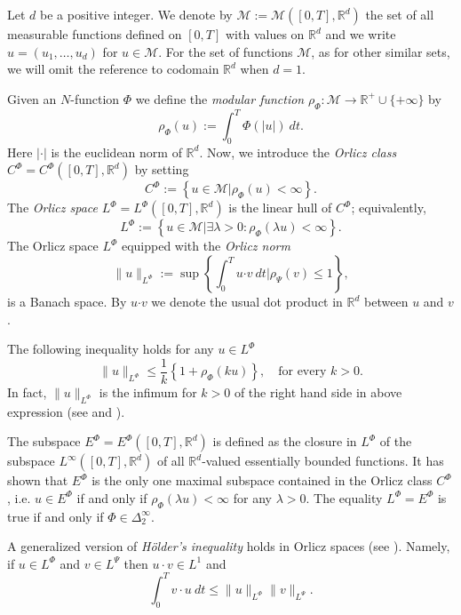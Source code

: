 \documentclass[twoside]{elsarticle}
\theoremstyle{remark}
\newcommand{\orlnor}{\|_{L^{\Phi}}}
\newcommand{\lphi}{L^{\Phi}}
\newcommand{\lpsi}{L^{\Psi}}
\newcommand{\ephi}{E^{\Phi}}
\newcommand{\claseor}{C^{\Phi}}
\renewcommand{\b}[1]{\boldsymbol{#1}}
\newcommand{\rr}{\mathbb{R}}
\renewcommand{\leq}{\leqslant}
\begin{document}
Let $d$ be a positive integer. We denote by $\mathcal{M}:=\mathcal{M}([0,T],\rr^d)$  the set of all measurable functions defined on $[0,T]$ with values on $\mathbb{R}^d$ and  we write $u=(u_1,\dots,u_d)$ for  $u\in \mathcal{M}$. For the set of functions $\mathcal{M}$, as for other similar sets, we will omit the reference to codomain $\mathbb{R}^d$ when $d=1$.


Given  an $N$-function $\Phi$ we define the \emph{modular function} 
$\rho_{\Phi}:\mathcal{M}\to \mathbb{R}^+\cup\{+\infty\}$ by
\[\rho_{\Phi}(u):= \int_0^T \Phi(|u|)\ dt.\]
Here $|\cdot|$ is the euclidean norm of $\mathbb{R}^d$.
Now, we introduce the \emph{Orlicz class} $C^{\Phi}=C^{\Phi}([0,T],\rr^d)$   by setting
\begin{equation}\label{claseOrlicz}
  C^{\Phi}:=\left\{u\in \mathcal{M} | \rho_{\Phi}(u)< \infty \right\}.
\end{equation}
The \emph{Orlicz space} $\lphi=L^{\Phi}([0,T],\rr^d)$ is the linear hull of $\claseor$;
equivalently,
\begin{equation}\label{espacioOrlicz}
\lphi:=\left\{ u\in \mathcal{M}| \exists \lambda>0: \rho_{\Phi}(\lambda u) < \infty   \right\}.
\end{equation}
  The Orlicz space $\lphi$ equipped with the \emph{Orlicz norm}
\[
\|  u  \orlnor:=\sup \left\{  \int_0^T u\b{\cdot} v\ dt \big| \rho_{\Psi}(v)\leq 1\right\},
\]
is a Banach space. By $u\b{\cdot} v$ we denote the usual dot product in $\mathbb{R}^{d}$ between $u$ and $v$.

The following  inequality holds for any $u\in\lphi$
\begin{equation}\label{amemiya-ine}
\|u\orlnor\leq \frac{1}{k}\left\{1+\rho_{\Phi}(ku)\right\},\quad\text{for every } k>0.
\end{equation}
In fact, $\|u\orlnor$ is the infimum for $k>0$ of the right hand side in above expression  (see \cite[Thm. 10.5]{KR} and \cite{hudzik2000amemiya}). 


The subspace $\ephi=\ephi([0,T],\rr^d)$ is defined as the closure in $\lphi$ of the subspace $L^{\infty}([0,T],\rr^d)$ of all $\mathbb{R}^d$-valued essentially bounded functions. It has shown that  $\ephi$ is the only one maximal subspace contained in the Orlicz class $\claseor$, i.e.
$u\in\ephi$ if and only if $\rho_{\Phi}(\lambda u)<\infty$ for any $\lambda>0$. The equality $\lphi=\ephi$ is true if and only if $\Phi\in\Delta_2^{\infty}$.

A generalized version of \emph{H\"older's inequality} holds in Orlicz spaces (see \cite[Thm. 9.3]{KR}). Namely, if $u\in\lphi$ and $v\in\lpsi$ then $u\cdot v\in L^1$ and
\begin{equation}\label{holder}
\int_0^Tv\cdot u\ dt\leq \|u\orlnor\|v\|_{L^{\Psi}}.
\end{equation}
\end{document}
